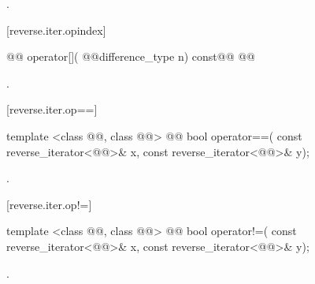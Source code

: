 \begin{itemdescr}
\pnum
\effects
{}

\pnum
\returns
{}.
\end{itemdescr}

[reverse.iter.opindex]{}

%
\begin{itemdecl}
@\removed{\unspec}@ operator[](
  @@difference_type n) const@\removed{;}@
    @@
\end{itemdecl}

\begin{itemdescr}
\pnum
\returns
{}.
\end{itemdescr}

[reverse.iter.op==]{}

%
\begin{itemdecl}
template <class @@, class @@>
    @@
  bool operator==(
    const reverse_iterator<@@>& x,
    const reverse_iterator<@@>& y);
\end{itemdecl}

\begin{itemdescr}
\pnum
\removed{\returns}
.
\end{itemdescr}

[reverse.iter.op!=]{}

%
\begin{itemdecl}
template <class @@, class @@>
    @@
  bool operator!=(
    const reverse_iterator<@@>& x,
    const reverse_iterator<@@>& y);
\end{itemdecl}

\begin{itemdescr}
\pnum
\removed{\returns}
.
\end{itemdescr}

